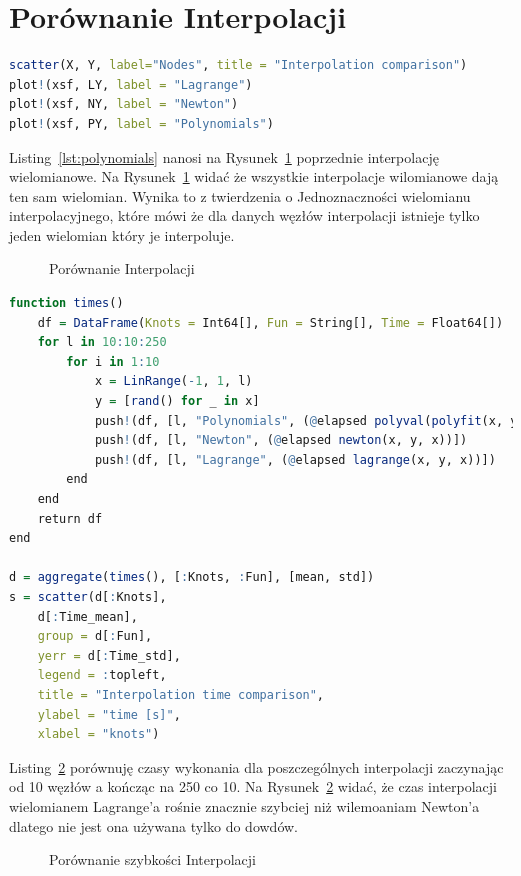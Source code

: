 \documentclass[12pt, a4paper]{article}
\begin{document}
\section{Porównanie Interpolacji}
\begin{lstlisting}[caption={Porównanie Interpolacji},language=R,label={lst:comparison}]
scatter(X, Y, label="Nodes", title = "Interpolation comparison")
plot!(xsf, LY, label = "Lagrange")
plot!(xsf, NY, label = "Newton")
plot!(xsf, PY, label = "Polynomials")
\end{lstlisting}
Listing~\ref{lst:polynomials} nanosi na Rysunek~\ref{fig:comparison} poprzednie interpolację wielomianowe.
Na Rysunek~\ref{fig:comparison} widać że wszystkie interpolacje wilomianowe dają ten sam wielomian. Wynika to z twierdzenia o Jednoznaczności wielomianu interpolacyjnego, które mówi że dla danych węzłów interpolacji istnieje tylko jeden wielomian który je interpoluje.
\begin{figure}[ht!]
	\centering    
	\def\svgwidth{\columnwidth}
	
	\caption{Porównanie Interpolacji}
	\label{fig:comparison}
\end{figure}
\begin{lstlisting}[caption={Porównanie szybkości Interpolacji},language=R,label={lst:time_comparison}]
function times()
	df = DataFrame(Knots = Int64[], Fun = String[], Time = Float64[])
	for l in 10:10:250
		for i in 1:10
			x = LinRange(-1, 1, l)
			y = [rand() for _ in x]
			push!(df, [l, "Polynomials", (@elapsed polyval(polyfit(x, y, length(x) - 1), x))])
			push!(df, [l, "Newton", (@elapsed newton(x, y, x))])
			push!(df, [l, "Lagrange", (@elapsed lagrange(x, y, x))])
		end
	end
	return df
end

d = aggregate(times(), [:Knots, :Fun], [mean, std])
s = scatter(d[:Knots], 
	d[:Time_mean], 
	group = d[:Fun], 
	yerr = d[:Time_std], 
	legend = :topleft,
	title = "Interpolation time comparison",
	ylabel = "time [s]", 
	xlabel = "knots")
\end{lstlisting}
Listing~\ref{fig:time_comparison} porównuję czasy wykonania dla poszczególnych interpolacji zaczynając od 10 węzłów a kończąc na 250 co 10.
Na Rysunek~\ref{fig:time_comparison} widać, że czas interpolacji wielomianem Lagrange'a rośnie znacznie szybciej niż wilemoaniam Newton'a dlatego nie jest ona używana tylko do dowdów.
\begin{figure}[ht!]
	\centering    
	\def\svgwidth{\columnwidth}
	
	\caption{Porównanie szybkości Interpolacji}
	\label{fig:time_comparison}
\end{figure}
\clearpage
\end{document}
